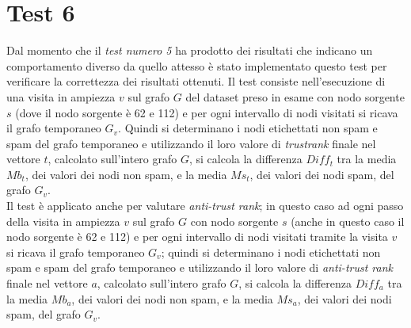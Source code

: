 \section{Test 6}
Dal momento che il \textit{test numero 5} ha prodotto dei risultati che indicano un comportamento diverso da quello attesso è stato implementato questo test per verificare la correttezza dei risultati ottenuti. Il test consiste nell'esecuzione di una visita in ampiezza \(v\) sul grafo \(G\) del dataset preso in esame con nodo sorgente \(s\) (dove il nodo sorgente è 62 e  112) e per ogni intervallo di nodi visitati si ricava il grafo temporaneo \(G_v\). Quindi si determinano i nodi etichettati non spam e spam del grafo temporaneo e utilizzando il loro valore di \textit{trustrank} finale nel vettore \(t\), calcolato sull'intero grafo \(G\), si calcola la differenza \(Diff_t\)   tra la media \(Mb_t\), dei valori dei nodi non spam, e la media \(Ms_t\), dei valori dei nodi spam,  del grafo \(G_v\).\\
Il test è applicato anche per valutare \textit{anti-trust rank}; in questo caso ad ogni passo della visita in ampiezza \(v\) sul grafo \(G\) con nodo sorgente \(s\) (anche in questo caso il nodo sorgente è 62 e  112) e per ogni intervallo di nodi visitati tramite la visita \(v\) si ricava il grafo temporaneo \(G_v\); quindi si determinano i nodi etichettati non spam e spam del grafo temporaneo e utilizzando il loro valore di \textit{anti-trust rank} finale nel vettore \(a\), calcolato sull'intero grafo \(G\), si calcola la differenza \(Diff_a\)   tra la media \(Mb_a\), dei valori dei nodi non spam, e la media \(Ms_a\), dei valori dei nodi spam,  del grafo \(G_v\).
